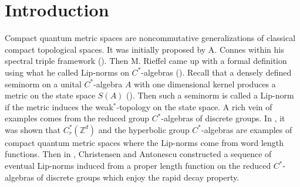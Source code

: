 \documentclass[a4paper,11pt,reqno]{amsart}
\theoremstyle{plain}
\theoremstyle{mainthmstyle}
\theoremstyle{named}
\numberwithin{equation}{section}
\begin{document}
\section{Introduction} Compact quantum metric spaces are noncommutative generalizations of classical compact topological spaces. It was initially proposed by A. Connes within his spectral triple framework (\cite{Connes1}). Then M. Rieffel came up with a formal definition using what he called Lip-norms on $C^{\ast}$-algebras (\cite{Rieffel1}). Recall that a densely defined seminorm on a unital $C^{\ast}$-algebra $A$ with one dimensional kernel produces a metric on the state space $S(A)$ (\cite{Rieffel1}). Then such a seminorm is called a Lip-norm if the metric induces the weak$^\ast$-topology on the state space.  A rich vein of examples comes from the reduced group $C^{\ast}$-algebras of discrete groups. In \cite{Rieffel2}, it was shown that $C^{\ast}_{r}(\mathbb{Z}^{d})$ and the hyperbolic group $C^{\ast}$-algebras are examples of compact quantum metric spaces where the Lip-norms come from word length functions. Then in \cite{Christensen}, Christensen and Antonescu constructed a sequence of eventual Lip-norms induced from a proper length function on the reduced $C^{\ast}$-algebras of discrete groups which enjoy the rapid decay property.\\
\end{document}
